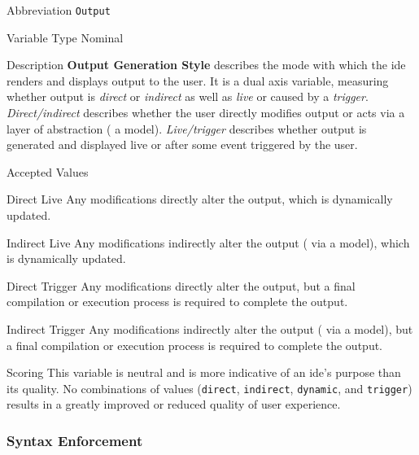 \begin{AlignedDesc}
  \item[Abbreviation] \texttt{Output}

  \item[Variable Type] Nominal

  \item[Description] \textbf{Output Generation Style} describes the mode
  with which the \ac{ide} renders and displays output to the user. It is a
  dual axis variable, measuring whether output is \textit{direct} or
  \textit{indirect} as well as \textit{live} or caused by a
  \textit{trigger}. \textit{Direct/indirect} describes whether the user directly
  modifies output or acts via a layer of abstraction (\eg{} a
  model). \textit{Live/trigger} describes whether output is generated and
  displayed live or after some event triggered by the user.

  \item[Accepted Values]

  \begin{AlignedDesc}
    \item[Direct Live] Any modifications directly alter the output, which
    is dynamically updated.
    \item[Indirect Live] Any modifications indirectly alter the output
    (\eg{} via a model), which is dynamically updated.
    \item[Direct Trigger] Any modifications directly alter the output, but
    a final compilation or execution process is required to complete the
    output.
    \item[Indirect Trigger] Any modifications indirectly alter the output
    (\eg{} via a model), but a final compilation or execution process is
    required to complete the output.
  \end{AlignedDesc}

  \item[Scoring] This variable is neutral and is more indicative of an
  \ac{ide}'s purpose than its quality. No combinations of values
  (\texttt{direct}, \texttt{indirect}, \texttt{dynamic}, and
  \texttt{trigger}) results in a greatly improved or reduced quality of
  user experience.

\end{AlignedDesc}

\subsubsection{Syntax Enforcement}
\label{subsubsec:syntax}

